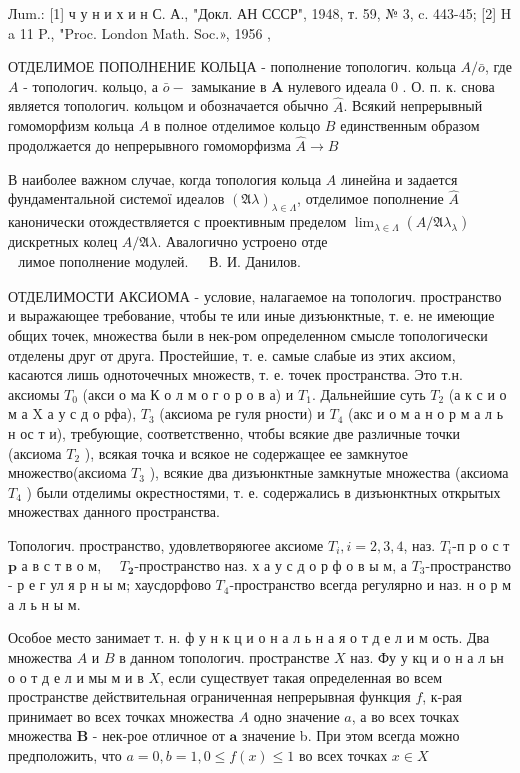 \documentclass[10pt]{article}
\begin{document}
Лum.: [1] ч у н и х и н С. А., "Докл. АН СССР", 1948, т. 59, № 3, c. 443-45; [2] H a 11 P., "Proc. London Math. Soc.», 1956 ,

ОТДЕЛИМОЕ ПОПОЛНЕНИЕ КОЛЬЦА - пополнение топологич. кольца $A / \bar{o}$, где $A$ - топологич. кольцо, а $\bar{o}-$ замыкание в $\boldsymbol{A}$ нулевого идеала 0 . О. п. к. снова является топологич. кольцом и обозначается обычно $\hat{A}$. Всякий непрерывный гомоморфизм кольца $A$ в полное отделимое кольцо $B$ единственным образом продолжается до непрерывного гомоморфизма $\hat{A} \rightarrow B$

В наиболее важном случае, когда топология кольца $A$ линейна и задается фундаментальной системої идеалов $(\mathfrak{A} \lambda)_{\lambda \in \Lambda}$, отделимое пополнение $\hat{A}$ канонически отождествляется с проективным пределом $\lim _{\lambda \in \Lambda}\left(A / \mathfrak{A} \lambda_{\lambda}\right)$ дискретных колец $A / \mathfrak{A} \lambda$. Авалогично устроено отде$\begin{array}{ll}\text { лимое пополнение модулей. } & \text { В. И. Данилов. }\end{array}$

ОТДЕЛИМОСТИ АКСИОМА - условие, налагаемое на топологич. пространство и выражающее требование, чтобы те или иные дизъюнктные, т. е. не имеющие общих точек, множества были в нек-ром определенном смысле топологически отделены друг от друга. Простейшие, т. е. самые слабые из этих аксиом, касаются лишь одноточечных множеств, т. е. точек пространства. Это т.н. аксиомы $T_{0}$ (акси о ма К о л м о г о р о в а) и $T_{1}$. Дальнейшие суть $T_{2}$ (а к с и о м а $\mathrm{X}$ а у с д о рфа), $T_{3}$ (аксиома ре гуля рности) и $T_{4}$ (акс и о м а н о р м а л ь н ос т и), требующие, соответственно, чтобы всякие две различные точки (аксиома $T_{2}$ ), всякая точка и всякое не содержащее ее замкнутое множество(аксиома $T_{3}$ ), всякие два дизъюнктные замкнутые множества (аксиома $T_{4}$ ) были отделимы окрестностями, т. е. содержались в дизъюнктных открытых множествах данного пространства.

Топологич. пространство, удовлетворяюгее аксиоме $T_{i}, i=2,3,4$, наз. $T_{i}$-п р о с т $\mathbf{p}$ а в с т в о м, $\quad T_{\mathbf{2}}$-пространство наз. х а у с д о р ф о в ы м, а $T_{3}$-пространство - р е г ул я р н ы м; хаусдорфово $T_{4}$-пространство всегда регулярно и наз. н о р м а л ь н ы м.

Особое место занимает т. н. ф у н к ц и о н а л ь н а я о т д е л и м ость. Два множества $A$ и $B$ в данном топологич. пространстве $X$ наз. Фу у кц и о н а л ьн о о т д е л и мы м и в $X$, если существует такая определенная во всем пространстве действительная ограниченная непрерывная функция $f$, к-рая принимает во всех точках множества $A$ одно значение $a$, а во всех точках множества $\boldsymbol{B}$ - нек-рое отличное от $\boldsymbol{a}$ значение b. При этом всегда можно предположить, что $a=0, b=1,0 \leqslant f(x) \leqslant 1$ во всех точках $x \in X$
\end{document}
